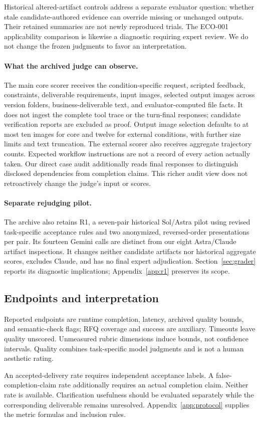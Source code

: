 Historical altered-artifact controls address a separate evaluator question: whether stale candidate-authored evidence can override missing or unchanged outputs. Their retained summaries are not newly reproduced trials. The ECO-001 applicability comparison is likewise a diagnostic requiring expert review. We do not change the frozen judgments to favor an interpretation.

\paragraph{What the archived judge can observe.}
The main core scorer receives the condition-specific request, scripted feedback, constraints, deliverable requirements, input images, selected output images across version folders, business-deliverable text, and evaluator-computed file facts. It does not ingest the complete tool trace or the turn-final responses; candidate verification reports are excluded as proof. Output image selection defaults to at most ten images for core and twelve for external conditions, with further size limits and text truncation. The external scorer also receives aggregate trajectory counts. Expected workflow instructions are not a record of every action actually taken. Our direct case audit additionally reads final responses to distinguish disclosed dependencies from completion claims. This richer audit view does not retroactively change the judge's input or scores.

\paragraph{Separate rejudging pilot.}
The archive also retains R1, a seven-pair historical Sol/Astra pilot using revised task-specific acceptance rules and two anonymized, reversed-order presentations per pair. Its fourteen Gemini calls are distinct from our eight Astra/Claude artifact inspections. It changes neither candidate artifacts nor historical aggregate scores, excludes Claude, and has no final expert adjudication. Section~\ref{sec:grader} reports its diagnostic implications; Appendix~\ref{app:r1} preserves its scope.

\subsection{Endpoints and interpretation}
Reported endpoints are runtime completion, latency, archived quality bounds, and semantic-check flags; RFQ coverage and success are auxiliary. Timeouts leave quality unscored. Unmeasured rubric dimensions induce bounds, not confidence intervals. Quality combines task-specific model judgments and is not a human aesthetic rating.

An accepted-delivery rate requires independent acceptance labels. A false-completion-claim rate additionally requires an actual completion claim. Neither rate is available. Clarification usefulness should be evaluated separately while the corresponding deliverable remains unresolved. Appendix~\ref{app:protocol} supplies the metric formulas and inclusion rules.
